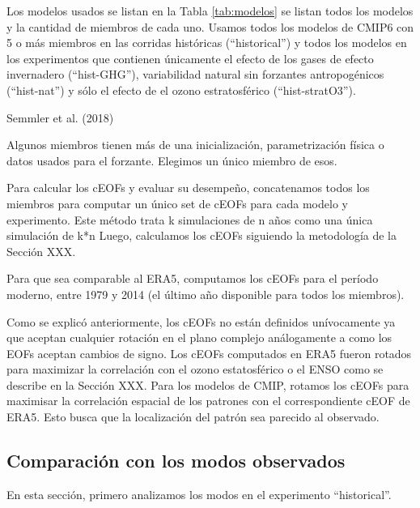 \documentclass[12pt,oneside]{reedthesis}
\begin{document}
Los modelos usados se listan en la Tabla \ref{tab:modelos} se listan todos los modelos y la cantidad de miembros de cada uno.
Usamos todos los modelos de CMIP6 con 5 o más miembros en las corridas históricas (``historical'') y todos los modelos en los experimentos que contienen únicamente el efecto de los gases de efecto invernadero (``hist-GHG''), variabilidad natural sin forzantes antropogénicos (``hist-nat'') y sólo el efecto de el ozono estratosférico (``hist-stratO3'').

Semmler et al. (2018)

Algunos miembros tienen más de una inicialización, parametrización física o datos usados para el forzante.
Elegimos un único miembro de esos.

Para calcular los cEOFs y evaluar su desempeño, concatenamos todos los miembros para computar un único set de cEOFs para cada modelo y experimento.
Este método trata k simulaciones de n años como una única simulación de k*n
Luego, calculamos los cEOFs siguiendo la metodología de la Sección XXX.

Para que sea comparable al ERA5, computamos los cEOFs para el período moderno, entre 1979 y 2014 (el último año disponible para todos los miembros).

Como se explicó anteriormente, los cEOFs no están definidos unívocamente ya que aceptan cualquier rotación en el plano complejo análogamente a como los EOFs aceptan cambios de signo.
Los cEOFs computados en ERA5 fueron rotados para maximizar la correlación con el ozono estatosférico o el ENSO como se describe en la Sección XXX.
Para los modelos de CMIP, rotamos los cEOFs para maximisar la correlación espacial de los patrones con el correspondiente cEOF de ERA5.
Esto busca que la localización del patrón sea parecido al observado.

\hypertarget{comparaciuxf3n-con-los-modos-observados}{%
\subsection{Comparación con los modos observados}\label{comparaciuxf3n-con-los-modos-observados}}

En esta sección, primero analizamos los modos en el experimento ``historical''.
\end{document}
